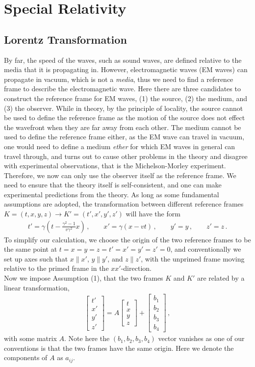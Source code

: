 \documentclass[11pt, onesided]{book}
\theoremstyle{break}
\theoremstyle{break}
\newcommand{\bmat}[1]{\begin{bmatrix} #1 \end{bmatrix}}
\begin{document}
\chapter{Special Relativity}
\section[Lorentz Transformation]{\color{red}Lorentz Transformation\color{black}}
By far, the speed of the waves, such as sound waves, are defined relative to the media that it is propagating in. However, electromagnetic waves (EM waves) can propagate in vacuum, which is not a \textit{media}, thus we need to find a reference frame to describe the electromagnetic wave. Here there are three candidates to construct the reference frame for EM waves, (1) the source, (2) the medium, and (3) the observer. While in theory, by the principle of locality, the source cannot be used to define the reference frame as the motion of the source does not effect the wavefront when they are far away from each other. The medium cannot be used to define the reference frame either, as the EM wave can travel in vacuum, one would need to define a medium \textit{ether} for which EM waves in general can travel through, and turns out to cause other problems in the theory and disagree with experimental observations, that is the Michelson-Morley experiment.\\


Therefore, we now can only use the observer itself as the reference frame. We need to ensure that the theory itself is self-consistent, and one can make experimental predictions from the theory. As long as some fundamental assumptions are adopted, the transformation between different reference frames $K=(t,x,y,z) \to K'=(t',x',y',z')$ will have the form
\begin{align}
t' = \gamma\left(t - \frac{\gamma^2 - 1}{v\gamma^2}x\right)\,,\qquad
x' = \gamma(x - vt) \,,\qquad
y' = y\,,\qquad
z' =z \,.
\end{align}
To simplify our calculation, we choose the origin of the two reference frames to be the same point at $t=x=y=z=t'=x'=y'=z' = 0$, and conventionally we set up axes such that $x\parallel x'$, $y\parallel y'$, and $z\parallel z'$, with the unprimed frame moving relative to the primed frame in the $xx'$-direction.\\ 

Now we impose Assumption (1), that the two frames $K$ and $K'$ are related by a linear transformation,
\begin{align*}
\bmat{t' \\ x'\\ y'\\ z'} = A \bmat{t \\ x\\y\\z} + \bmat{b_1\\ b_2 \\ b_3 \\ b_4}\,,
\end{align*}
with some matrix $A$. Note here the $(b_1,b_2,b_3,b_4)$ vector vanishes as one of our conventions is that the two frames have the same origin. Here we denote the components of $A$ as $a_{ij}$. \\
\end{document}
